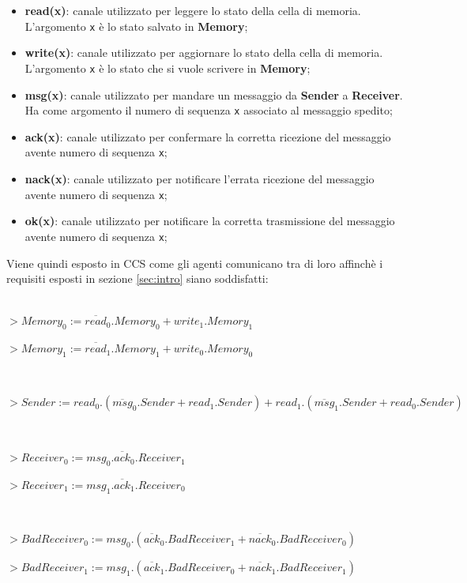 \begin{itemize}
\item \textbf{read(x)}: canale utilizzato per leggere lo stato della cella di
  memoria. \\
  L'argomento \texttt{x} è lo stato salvato in \textbf{Memory};
\item \textbf{write(x)}: canale utilizzato per aggiornare lo stato della cella
  di memoria. \\
  L'argomento \texttt{x} è lo stato che si vuole scrivere in \textbf{Memory};
\item \textbf{msg(x)}: canale utilizzato per mandare un messaggio da
  \textbf{Sender} a \textbf{Receiver}. \\
  Ha come argomento il numero di sequenza \texttt{x} associato al messaggio
  spedito;
\item \textbf{ack(x)}: canale utilizzato per confermare la corretta ricezione
  del messaggio avente numero di sequenza \texttt{x};
\item \textbf{nack(x)}: canale utilizzato per notificare l'errata ricezione
  del messaggio avente numero di sequenza \texttt{x};
\item \textbf{ok(x)}: canale utilizzato per notificare la corretta trasmissione
  del messaggio avente numero di sequenza \texttt{x};
\end{itemize}

Viene quindi esposto in CCS come gli agenti comunicano tra di loro affinchè i
requisiti esposti in sezione \ref{sec:intro} siano soddisfatti: \\

$ $

$ > Memory_0 := \overline{read}_0.Memory_0 + write_1.Memory_1 $

$ > Memory_1 := \overline{read}_1.Memory_1 + write_0.Memory_0 $

$ $

$ > Sender := read_0.(\overline{msg}_0.Sender + read_1.Sender) +
              read_1.(\overline{msg}_1.Sender + read_0.Sender) $

$ $

$ > Receiver_0 := msg_0.\overline{ack}_0.Receiver_1 $

$ > Receiver_1 := msg_1.\overline{ack}_1.Receiver_0 $

$ $

$ > BadReceiver_0 := msg_0.(\overline{ack}_0.BadReceiver_1 +
                            \overline{nack}_0.BadReceiver_0) $

$ > BadReceiver_1 := msg_1.(\overline{ack}_1.BadReceiver_0 +
                            \overline{nack}_1.BadReceiver_1) $

